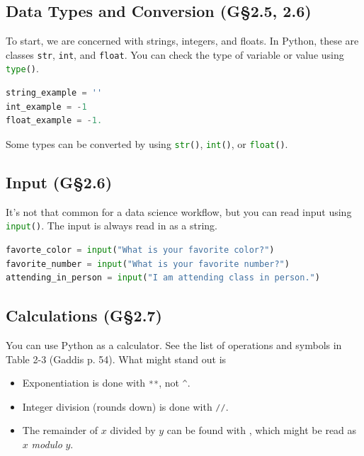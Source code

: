 \subsection{Data Types and Conversion (G\S 2.5, 2.6)}

To start, we are concerned with strings, integers, and floats. In Python, these are classes 
\lstinline{str}, \lstinline{int}, and \lstinline{float}.
You can check the type of variable or value using \lstinline[language = Python]{type()}.


\begin{lstlisting}[language = Python]
string_example = ''
int_example = -1
float_example = -1. \end{lstlisting}

\smallskip
 Some types can be converted by using \lstinline[language = Python]{str()},
\lstinline[language = Python]{int()}, or \lstinline[language = Python]{float()}.


\subsection{Input (G\S 2.6)}

It's not that common for a data science workflow, but you can read input using \lstinline[language = Python]{input()}.
The input is always read in as a string.

\begin{lstlisting}[language = Python]
favorte_color = input("What is your favorite color?")
favorite_number = input("What is your favorite number?")
attending_in_person = input("I am attending class in person.") \end{lstlisting}


\subsection{Calculations (G\S 2.7)}

You can use Python as a calculator. See the list of operations and symbols in Table 2-3 (Gaddis p. 54).
What might stand out is 
\begin{itemize}
\item Exponentiation is done with \lstinline[language = Python]{**}, not \lstinline[language = Python]{^}.
\item Integer division (rounds down) is done with \lstinline[language = Python]{//}.
\item The remainder of $x$ divided by $y$ can be found with , which might be read as
$x$ \emph{modulo} $y$. 
\end{itemize}

